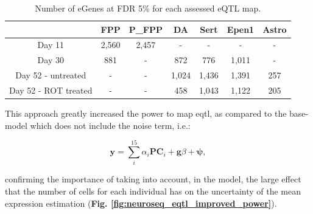 \begin{table}[h]
    \centering
    \begin{tabular}{c|c c c c c c}
    &         FPP & P\_FPP & DA & Sert & Epen1 & Astro \\
    \hline
    Day 11  & 2,560 & 2,457 & - & - & - & - \\
    Day 30  & 881 & - &  872 & 776 & 1,011 & -  \\
    Day 52 - untreated & - & - & 1,024 & 1,436 & 1,391 & 257 \\
    Day 52 - ROT treated & - & -  & 458 & 1,043 & 1,122 & 205 \\
    \end{tabular}
    \caption{Number of eGenes at FDR 5\% for each assessed eQTL map.}
    \label{tab:eqtl_results}
\end{table}


This approach greatly increased the power to map \gls{eqtl},
as compared to the base-model which does not include the noise term, i.e.:

\begin{equation}\label{eq:neuroseq_base}
    \mathbf{y} = \sum_i^{15}\alpha_i \mathbf{PC}_i + \mathbf{g}\beta + \boldsymbol{\psi},
\end{equation}

confirming the importance of taking into account, in the model, the large effect that the number of cells for each individual has on the 
uncertainty
of the mean expression estimation (\textbf{Fig. \ref{fig:neuroseq_eqtl_improved_power}}).



